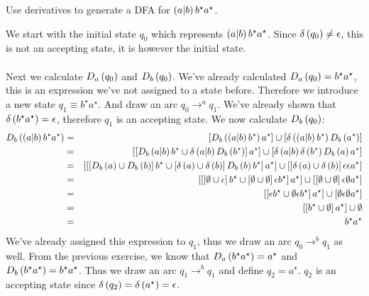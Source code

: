 \documentclass{article}
\begin{document}
\begin{exercise}
Use derivatives to generate a DFA for $\left( a|b \right)b^{\star}a^{\star}$.
\begin{answer}
We start with the initial state $q_0$ which represents $\left( a|b \right)b^{\star}a^{\star}$. Since $\delta\left( q_0 \right)\neq\epsilon$, this is not an accepting state, it is however the initial state.
\paragraph{}
Next we calculate $D_a\left( q_0 \right)$ and $D_b\left( q_0 \right)$. We've already calculated $D_a\left( q_0 \right)=b^{\star}a^{\star}$, this is an expression we've not assigned to a state before. Therefore we introduce a new state $q_1\equiv b^{\star}a^{\star}$. And draw an arc $q_0\rightarrow^a q_1$. We've already shown that $\delta\left( b^{\star}a^{\star} \right)=\epsilon$, therefore $q_1$ is an accepting state. We now calculate $D_b\left( q_0 \right)$:
\begin{eqnarray}
D_b\left( \left( a|b \right)b^{\star}a^{\star} \right)&=&\left[ D_b\left( \left( a|b \right)b^{\star} \right)a^{\star} \right]\cup\left[ \delta\left( \left( a|b \right)b^{\star} \right)D_b\left( a^{\star} \right) \right]\\
&=&\left[ \left[ D_b\left( a|b \right)b^{\star}\cup\delta\left( a|b \right)D_b\left( b^{\star} \right) \right]a^{\star} \right]\cup\left[ \delta\left( a|b \right)\delta\left( b^{\star} \right)D_b\left( a \right)a^{\star} \right]\\
&=&\left[ \left[ \left[ D_b\left( a \right)\cup D_b\left( b \right) \right]b^{\star}\cup\left[ \delta\left( a \right)\cup\delta\left( b \right) \right]D_b\left( b \right)b^{\star} \right]a^{\star} \right]\cup\left[ \left[ \delta\left( a \right)\cup\delta\left( b \right) \right]\epsilon\epsilon a^{\star} \right]\\
&=&\left[ \left[ \left[ \emptyset\cup\epsilon \right]b^{\star}\cup\left[ \emptyset\cup\emptyset \right]\epsilon b^{\star} \right]a^{\star} \right]\cup\left[ \left[ \emptyset\cup\emptyset \right]\epsilon\emptyset a^{\star} \right]\\
&=&\left[ \left[ \epsilon b^{\star}\cup\emptyset\epsilon b^{\star} \right]a^{\star} \right]\cup\left[ \emptyset\epsilon\emptyset a^{\star} \right]\\
&=&\left[ \left[ b^{\star}\cup\emptyset \right]a^{\star} \right]\cup\emptyset\\
&=&b^{\star}a^{\star}
\end{eqnarray}
We've already assigned this expression to $q_1$, thus we draw an arc $q_0\rightarrow^b q_1$ as well. From the previous exercise, we know that $D_a\left( b^{\star}a^{\star} \right)=a^{\star}$ and $D_b\left( b^{\star}a^{\star} \right)=b^{\star}a^{\star}$. Thus we draw an arc $q_1\rightarrow^b q_1$ and define $q_2=a^{\star}$. $q_2$ is an accepting state since $\delta\left( q_2 \right)=\delta\left( a^{\star} \right)=\epsilon$.

\end{answer}
\end{exercise}
\end{document}
